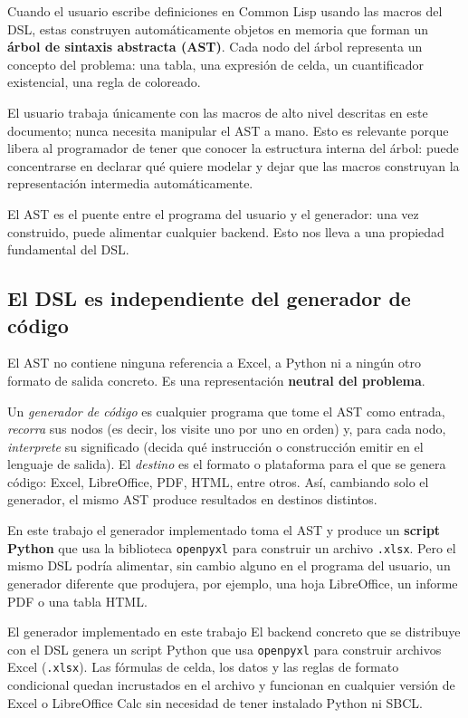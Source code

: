 \documentclass[12pt,a4paper]{report}
\begin{document}
Cuando el usuario escribe definiciones en Common Lisp usando las macros del
DSL, estas construyen automáticamente objetos en memoria que forman un
\textbf{árbol de sintaxis abstracta (AST)}.  Cada nodo del árbol representa
un concepto del problema: una tabla, una expresión de celda, un cuantificador
existencial, una regla de coloreado.

El usuario trabaja únicamente con las macros de alto nivel descritas en este
documento; nunca necesita manipular el AST a mano.  Esto es relevante porque
libera al programador de tener que conocer la estructura interna del árbol:
puede concentrarse en declarar qué quiere modelar y dejar que las macros
construyan la representación intermedia automáticamente.

El AST es el puente entre el programa del usuario y el generador: una vez
construido, puede alimentar cualquier backend.  Esto nos lleva a una
propiedad fundamental del DSL.

\subsection{El DSL es independiente del generador de código}

El AST no contiene ninguna referencia a Excel, a Python ni a ningún otro
formato de salida concreto.  Es una representación \textbf{neutral del problema}.

Un \emph{generador de código} es cualquier programa que tome el AST como
entrada, \emph{recorra} sus nodos (es decir, los visite uno por uno en orden)
y, para cada nodo, \emph{interprete} su significado (decida qué instrucción
o construcción emitir en el lenguaje de salida).  El \emph{destino} es el
formato o plataforma para el que se genera código: Excel, LibreOffice, PDF,
HTML, entre otros.  Así, cambiando solo el generador, el mismo AST produce
resultados en destinos distintos.

En este trabajo el generador implementado toma el AST y produce un
\textbf{script Python} que usa la biblioteca \texttt{openpyxl} para
construir un archivo \texttt{.xlsx}.  Pero el mismo DSL podría alimentar,
sin cambio alguno en el programa del usuario, un generador diferente que
produjera, por ejemplo, una hoja LibreOffice, un informe PDF o una tabla
HTML.

\begin{infobox}{El generador implementado en este trabajo}
El backend concreto que se distribuye con el DSL genera un script Python
que usa \texttt{openpyxl} para construir archivos Excel (\texttt{.xlsx}).
Las fórmulas de celda, los datos y las reglas de formato condicional quedan
incrustados en el archivo y funcionan en cualquier versión de Excel o
LibreOffice Calc sin necesidad de tener instalado Python ni SBCL.
\end{infobox}
\end{document}

